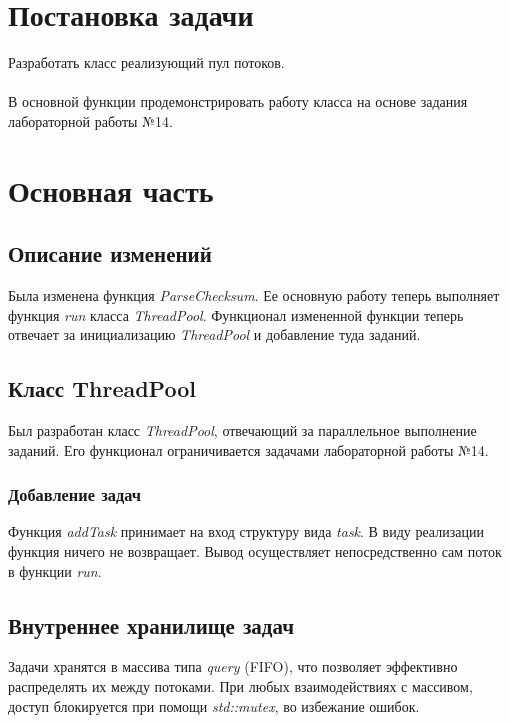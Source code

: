 \documentclass[a4paper, 12pt]{article}
\begin{document}
\cleardoublepage
\section*{Постановка задачи}
Разработать класс реализующий пул потоков.
\\ \\
В основной функции продемонстрировать работу класса на основе задания 
лабораторной работы №14.
\cleardoublepage



\section*{Основная часть}

\subsection{Описание изменений}
Была изменена функция \textit{ParseChecksum}. Ее основную работу теперь выполняет
функция \textit{run} класса \textit{ThreadPool}. Функционал измененной функции теперь отвечает
за инициализацию \textit{ThreadPool} и добавление туда заданий.

\subsection{Класс \textbf{ThreadPool}}
Был разработан класс \textit{ThreadPool}, отвечающий за параллельное выполнение заданий.
Его функционал ограничивается задачами лабораторной работы №14. 

\subsubsection{Добавление задач}
Функция \textit{addTask} принимает на вход структуру вида \textit{task}. В виду реализации
функция ничего не возвращает. Вывод осуществляет непосредственно сам поток в функции
\textit{run}.

\subsection{Внутреннее хранилище задач}
Задачи хранятся в массива типа \textit{query} (FIFO), что позволяет эффективно распределять
их между потоками. При любых взаимодействиях с массивом, доступ блокируется при помощи
\textit{std::mutex}, во избежание ошибок.
\end{document}
